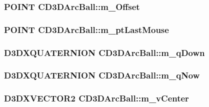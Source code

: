 \hypertarget{class_c_d3_d_arc_ball_ab6246cc5b63d98a3dfcb4530cae75ef4}{
\subsubsection[{m\_\-Offset}]{\setlength{\rightskip}{0pt plus 5cm}POINT {\bf CD3DArcBall::m\_\-Offset}}}
\label{class_c_d3_d_arc_ball_ab6246cc5b63d98a3dfcb4530cae75ef4}
\hypertarget{class_c_d3_d_arc_ball_ae4114109f3ae6ae749748210b54405ad}{
\subsubsection[{m\_\-ptLastMouse}]{\setlength{\rightskip}{0pt plus 5cm}POINT {\bf CD3DArcBall::m\_\-ptLastMouse}}}
\label{class_c_d3_d_arc_ball_ae4114109f3ae6ae749748210b54405ad}
\hypertarget{class_c_d3_d_arc_ball_a944bbe7cbea8e5c715b1c62a0a6ba32f}{
\subsubsection[{m\_\-qDown}]{\setlength{\rightskip}{0pt plus 5cm}D3DXQUATERNION {\bf CD3DArcBall::m\_\-qDown}}}
\label{class_c_d3_d_arc_ball_a944bbe7cbea8e5c715b1c62a0a6ba32f}
\hypertarget{class_c_d3_d_arc_ball_a248db3d61e41f65195810367bbe849f1}{
\subsubsection[{m\_\-qNow}]{\setlength{\rightskip}{0pt plus 5cm}D3DXQUATERNION {\bf CD3DArcBall::m\_\-qNow}}}
\label{class_c_d3_d_arc_ball_a248db3d61e41f65195810367bbe849f1}
\hypertarget{class_c_d3_d_arc_ball_a6075b159b5221b3091e32b090c0dcab3}{
\subsubsection[{m\_\-vCenter}]{\setlength{\rightskip}{0pt plus 5cm}D3DXVECTOR2 {\bf CD3DArcBall::m\_\-vCenter}}}
